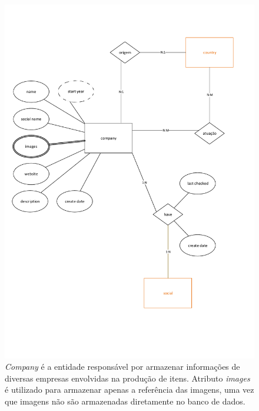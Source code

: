 \documentclass[12pt]{article}
\begin{document}
\begin{figure}[H]
\centering
\includegraphics[width=1\textwidth]{MER_-_Company.pdf}
\caption{\textit{Company} é a entidade responsável por armazenar informações de diversas empresas envolvidas na produção de itens. Atributo \textit{images} é utilizado para armazenar apenas a referência das imagens, uma vez que imagens não são armazenadas diretamente no banco de dados.}\label{company}
\end{figure}
\end{document}
